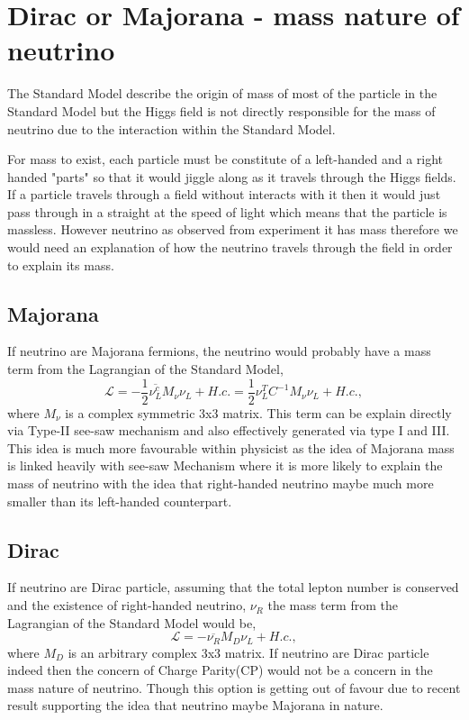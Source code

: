 \documentclass[11pt ,a4paper]{article}
\begin{document}
\section*{Dirac or Majorana - mass nature of neutrino}
The Standard Model describe the origin of mass of most of the particle in the Standard Model but the Higgs field is not directly responsible for the mass of neutrino due to the interaction within the Standard Model. 

For mass to exist, each particle must be constitute of a left-handed and a right handed "parts" so that it would jiggle along as it travels through the Higgs fields. If a particle travels through a field without interacts with it then it would just pass through in a straight at the speed of light which means that the particle is massless. However neutrino as observed from experiment it has mass therefore we would need an explanation of how the neutrino travels through the field in order to explain its mass.\cite{constraint}
\subsection*{Majorana}
If neutrino are Majorana fermions, the neutrino would probably have a mass term from the Lagrangian of the Standard Model,\cite{constraint}
\begin{equation}
\mathcal{L}= -\frac{1}{2}\overline{\nu_L^c}M_{\nu}\nu_L+H.c.= \frac{1}{2}\nu_L^TC^{-1}M_{\nu}\nu_L+H.c., 
\end{equation}
where \(M_{\nu} \) is a complex symmetric 3x3 matrix. This term can be explain directly via Type-II see-saw mechanism and also effectively generated via type I and III. \cite{constraint} This idea is much more favourable within physicist as the idea of Majorana mass is linked heavily with see-saw Mechanism where it is more likely to explain the mass of neutrino with the idea that right-handed neutrino maybe much more smaller than its left-handed counterpart.
\subsection*{Dirac}
If neutrino are Dirac particle, assuming that the total lepton number is conserved and the existence of right-handed neutrino, \(\nu_R \) the mass term from the Lagrangian of the Standard Model would be,\cite{constraint}
\begin{equation}
\mathcal{L}=-\overline{\nu_R}M_D\nu_L+H.c.,
\end{equation}
where \(M_D \) is an arbitrary complex 3x3 matrix.\cite{constraint} If neutrino are Dirac particle indeed then the concern of Charge Parity(CP) would not be a concern in the mass nature of neutrino. Though this option is getting out of favour due to recent result supporting the idea that neutrino maybe Majorana in nature.
\end{document}
